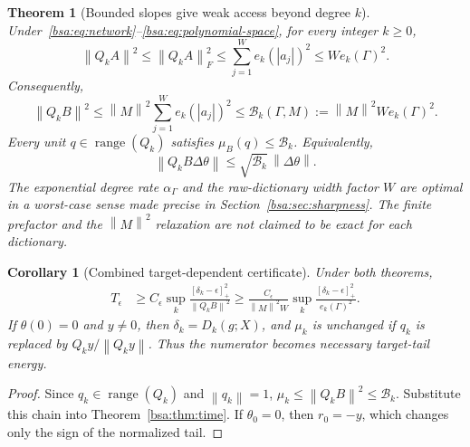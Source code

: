 \documentclass[11pt,letterpaper]{article}
\newcommand{\bsaNorm}[1]{\left\lVert #1\right\rVert}
\newcommand{\bsaPos}[1]{\left[#1\right]_+}
\DeclareMathOperator{\bsaRange}{range}
\newtheorem{bsaTheorem}{Theorem}
\newtheorem{bsaCorollary}{Corollary}[section]
\theoremstyle{remark}
\theoremstyle{plain}
\begin{document}
\begin{bsaTheorem}[Bounded slopes give weak access beyond degree $k$]
\label{bsa:thm:access}
Under~\eqref{bsa:eq:network}--\eqref{bsa:eq:polynomial-space}, for every integer $k\ge0$,
\begin{equation}
 \bsaNorm{Q_kA}^2
 \le\bsaNorm{Q_kA}_F^2
 \le\sum_{j=1}^W e_k(|a_j|)^2
 \le W e_k(\Gamma)^2.
 \label{bsa:eq:raw-access}
\end{equation}
Consequently,
\begin{equation}
 \boxed{\bsaNorm{Q_kB}^2
 \le\bsaNorm M^2\sum_{j=1}^W e_k(|a_j|)^2
 \le\mathcal B_k(\Gamma,M):=\bsaNorm M^2W e_k(\Gamma)^2.}
 \label{bsa:eq:transformed-access}
\end{equation}
Every unit $q\in\bsaRange(Q_k)$ satisfies $\mu_B(q)\le\mathcal B_k$. Equivalently,
\begin{equation}
 \bsaNorm{Q_kB\Delta\theta}\le\sqrt{\mathcal B_k}\,\bsaNorm{\Delta\theta}.
 \label{bsa:eq:output-movement}
\end{equation}
The exponential degree rate $\alpha_\Gamma$ and the raw-dictionary width factor $W$ are optimal in a worst-case sense made precise in Section~\ref{bsa:sec:sharpness}. The finite prefactor and the $\bsaNorm M^2$ relaxation are not claimed to be exact for each dictionary.
\end{bsaTheorem}

\begin{bsaCorollary}[Combined target-dependent certificate]
\label{bsa:cor:combined}
Under both theorems,
\begin{align}
 T_\epsilon
 &\ge C_\epsilon\sup_k
 \frac{\bsaPos{\delta_k-\epsilon}^2}{\bsaNorm{Q_kB}^2}
 \ge\frac{C_\epsilon}{\bsaNorm M^2W}
 \sup_k\frac{\bsaPos{\delta_k-\epsilon}^2}{e_k(\Gamma)^2}.
 \label{bsa:eq:combined}
\end{align}
If $\theta(0)=0$ and $y\ne0$, then $\delta_k=D_k(g;X)$, and $\mu_k$ is unchanged if $q_k$ is replaced by $Q_ky/\bsaNorm{Q_ky}$. Thus the numerator becomes necessary \emph{target}-tail energy.
\end{bsaCorollary}
\begin{proof}
Since $q_k\in\bsaRange(Q_k)$ and $\bsaNorm{q_k}=1$,
$\mu_k\le\bsaNorm{Q_kB}^2\le\mathcal B_k$. Substitute this chain into Theorem~\ref{bsa:thm:time}. If $\theta_0=0$, then $r_0=-y$, which changes only the sign of the normalized tail.
\end{proof}
\end{document}
